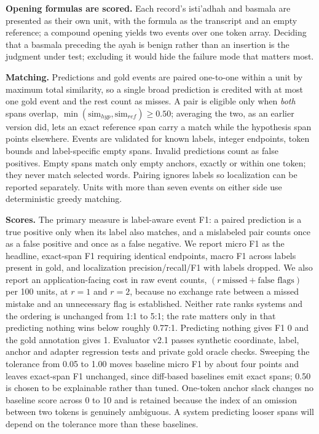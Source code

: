 \documentclass{article}
\begin{document}
\textbf{Opening formulas are scored.} Each record's isti'adhah and basmala are presented as their own unit, with the formula as the transcript and an empty reference; a compound opening yields two events over one token array. Deciding that a basmala preceding the ayah is benign rather than an insertion is the judgment under test; excluding it would hide the failure mode that matters most.

\textbf{Matching.} Predictions and gold events are paired one-to-one within a unit by maximum total similarity, so a single broad prediction is credited with at most one gold event and the rest count as misses. A pair is eligible only when \emph{both} spans overlap, $\min(\mathrm{sim}_{hyp}, \mathrm{sim}_{ref}) \ge 0.50$; averaging the two, as an earlier version did, lets an exact reference span carry a match while the hypothesis span points elsewhere. Events are validated for known labels, integer endpoints, token bounds and label-specific empty spans. Invalid predictions count as false positives. Empty spans match only empty anchors, exactly or within one token; they never match selected words. Pairing ignores labels so localization can be reported separately. Units with more than seven events on either side use deterministic greedy matching.

\textbf{Scores.} The primary measure is label-aware event F1: a paired prediction is a true positive only when its label also matches, and a mislabeled pair counts once as a false positive and once as a false negative. We report micro F1 as the headline, exact-span F1 requiring identical endpoints, macro F1 across labels present in gold, and localization precision/recall/F1 with labels dropped. We also report an application-facing cost in raw event counts, $(r\,\text{missed} + \text{false flags})$ per 100 units, at $r=1$ and $r=2$, because no exchange rate between a missed mistake and an unnecessary flag is established. Neither rate ranks systems and the ordering is unchanged from 1:1 to 5:1; the rate matters only in that predicting nothing wins below roughly 0.77:1. Predicting nothing gives F1 0 and the gold annotation gives 1. Evaluator v2.1 passes synthetic coordinate, label, anchor and adapter regression tests and private gold oracle checks. Sweeping the tolerance from 0.05 to 1.00 moves baseline micro F1 by about four points and leaves exact-span F1 unchanged, since diff-based baselines emit exact spans; 0.50 is chosen to be explainable rather than tuned. One-token anchor slack changes no baseline score across 0 to 10 and is retained because the index of an omission between two tokens is genuinely ambiguous. A system predicting looser spans will depend on the tolerance more than these baselines.
\end{document}
